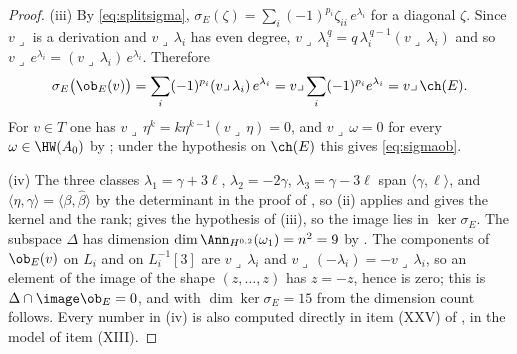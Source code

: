 \begin{proof}
(iii) By \eqref{eq:splitsigma}, $\sigma_{E}(\zeta)=\sum_{i}(-1)^{p_{i}}
\zeta_{ii}\,e^{\lambda_{i}}$ for a diagonal $\zeta$. Since $v\lrcorner$ is a
derivation and $v\lrcorner\,\lambda_{i}$ has even degree,
$v\lrcorner\,\lambda_{i}^{\,q}=q\,\lambda_{i}^{\,q-1}(v\lrcorner\,\lambda_{i})$
and so $v\lrcorner\,e^{\lambda_{i}}=(v\lrcorner\,\lambda_{i})\,e^{\lambda_{i}}$.
Therefore
\[
  \sigma_{E}\bigl(\ob_{E}(v)\bigr)
  =\sum_{i}(-1)^{p_{i}}(v\lrcorner\,\lambda_{i})\,e^{\lambda_{i}}
  =v\lrcorner\sum_{i}(-1)^{p_{i}}e^{\lambda_{i}}
  =v\lrcorner\,\ch(E).
\]
For $v\in T$ one has $v\lrcorner\,\eta^{k}=k\eta^{k-1}(v\lrcorner\,\eta)=0$,
and $v\lrcorner\,\omega=0$ for every $\omega\in\HW(A_{0})$ by
; under the hypothesis on $\ch(E)$ this gives
\eqref{eq:sigmaob}.

(iv) The three classes $\lambda_{1}=\gamma+3\ell$, $\lambda_{2}=-2\gamma$,
$\lambda_{3}=\gamma-3\ell$ span $\langle\gamma,\ell\rangle$, and
$\langle\eta,\gamma\rangle=\langle\beta,\widehat\beta\rangle$ by the
determinant in the proof of , so (ii) applies and
gives the kernel and the rank;  gives the
hypothesis of (iii), so the image lies in $\ker\sigma_{E}$. The subspace
$\Delta$ has dimension $\dim\Ann_{H^{0,2}}(\omega_{1})=n^{2}=9$ by
. The components of $\ob_{E}(v)$ on $L_{i}$ and on
$L_{i}^{-1}[3]$ are $v\lrcorner\,\lambda_{i}$ and
$v\lrcorner\,(-\lambda_{i})=-v\lrcorner\,\lambda_{i}$, so an element of the
image of the shape $(z,\dots,z)$ has $z=-z$, hence is zero; this is
$\Delta\cap\image\ob_{E}=0$, and with $\dim\ker\sigma_{E}=15$ from
 the dimension count follows. Every number in (iv)
is also computed directly in item (XXV) of , in the
model of item (XIII).
\end{proof}

